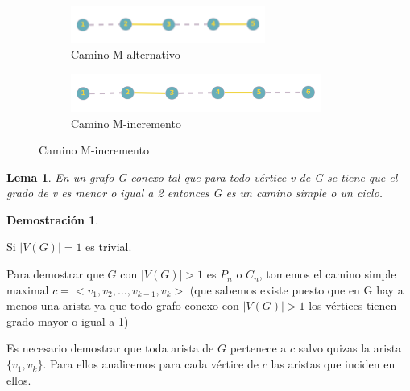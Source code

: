 \documentclass[a4paper,1pt]{report}
\newtheorem*{dem}{Demostración}
\newtheorem*{lem}{Lema}
\begin{document}
\begin{figure}[H]
    \centering
    \begin{subfigure}[b]{0.80\textwidth}
        \centering
        \includegraphics[width=0.7\textwidth]{figures7/malternativo.png}
        \caption{Camino M-alternativo}
    \end{subfigure} 
    \begin{subfigure}[b]{0.70\textwidth}
        \centering
        \includegraphics[width=0.9\textwidth]{figures7/mincremento.png}
        \caption{Camino M-incremento}
    \end{subfigure}
\end{figure} 

\begin{lem}
 En un grafo G conexo tal que para todo vértice  v de G se tiene que el grado de v es menor o igual a 2 entonces G es un camino simple o un ciclo.
\end{lem}

\begin{dem}
 
\end{dem}

Si $|V(G)| = 1$ es trivial.

Para demostrar que $G$ con $|V(G)| >1$ es $P_n$ o $C_n$, tomemos el camino simple maximal $c=<v_1,v_2,\dots,v_{k-1},v_k>$ (que sabemos existe puesto que en G hay a menos una arista ya que todo grafo conexo con $|V(G)| > 1$ los v\'ertices tienen grado mayor o igual a 1)

Es necesario demostrar que toda arista de $G$ pertenece a $c$ salvo quizas la arista $\{v_1,v_k\}$. Para ellos analicemos para cada v\'ertice de $c$ las aristas que inciden en ellos.
\end{document}
